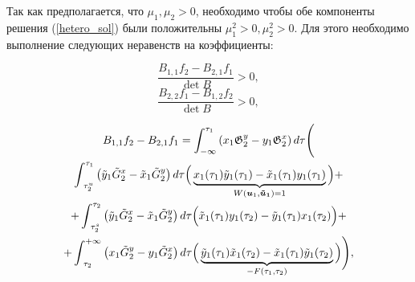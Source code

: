 


Так как предполагается, что $\mu_1, \mu_2 > 0$, необходимо чтобы обе компоненты решения (\ref{hetero_sol}) были положительны  $\mu_1^2>0, \mu_2^2>0$. Для этого необходимо выполнение следующих неравенств на коэффициенты:

$$\frac{B_{1,1}f_2 - B_{2,1}f_1}{\det B} > 0,$$
$$\frac{B_{2,2}f_1 - B_{1,2}f_2}{\det B} > 0,$$

\begin{multline*}
B_{1,1}f_2 - B_{2,1}f_1 = \int_{-\infty}^{\tau_1} \left( x_1 \mathfrak{G}_2^y - y_1 \mathfrak{G}_2^x \right) d \tau \Bigg(\\
  \int_{\text{ } \tau_2^u}^{\tau_1} \left( \tilde y_1 \tilde{G}_2^x - \tilde x_1 \tilde{G}_2^y \right) d \tau \Big( 
        \underbrace{x_1(\tau_1) \tilde y_1(\tau_1) - \tilde x_1(\tau_1) y_1(\tau_1)}_{W(\boldsymbol{u}_1, \boldsymbol{\tilde u_1}) = 1}
    \Big)+\\
+ \int_{\text{ } \tau_2^s}^{\tau_2} \left( \tilde y_1 \tilde{G}_2^x - \tilde x_1 \tilde{G}_2^y \right) d \tau\Big( 
        \tilde x_1(\tau_1) y_1(\tau_2) - \tilde y_1(\tau_1) x_1(\tau_2)
    \Big)+\\
+ \int_{\text{ } \tau_2}^{+\infty} \left( x_1 \tilde{G}_2^y - y_1 \tilde{G}_2^x \right) d \tau\Big( 
        \underbrace{\tilde y_1(\tau_1) \tilde x_1(\tau_2) - \tilde x_1(\tau_1) \tilde y_1(\tau_2)}_{-F(\tau_1,\tau_2)}
    \Big)
\Bigg),
\end{multline*}


